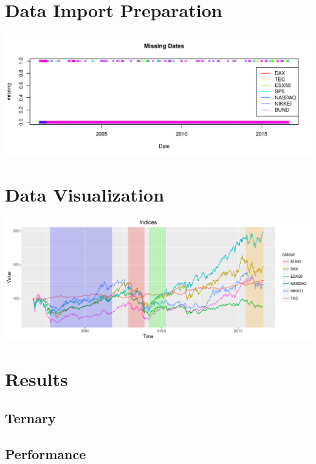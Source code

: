 \documentclass{scrbook}
\begin{document}
\chapter{Data Import Preparation}
\includegraphics[width=\textwidth]{missingDates.pdf}


\chapter{Data Visualization}
\includegraphics[width=\textwidth]{retPlot.pdf}




\chapter{Results}

\section{Ternary}
\clearpage


\clearpage
\section{Performance}
\end{document}
